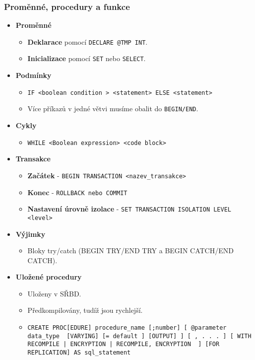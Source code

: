 \subsubsection{Proměnné, procedury a funkce}
\begin{itemize}
\item \textbf{Proměnné}
\begin{itemize}
\item \textbf{Deklarace} pomocí \texttt{DECLARE @TMP INT}.
\item \textbf{Inicializace} pomocí \texttt{SET} nebo \texttt{SELECT}.
\end{itemize}

\item \textbf{Podmínky}
\begin{itemize}
\item \texttt{IF <boolean condition > <statement> ELSE <statement>}
\item Více příkazů v jedné větvi musíme obalit do \texttt{BEGIN/END}.
\end{itemize}


\item \textbf{Cykly}
\begin{itemize}
\item \texttt{WHILE <Boolean expression> <code block>}
\end{itemize}


\item \textbf{Transakce}
\begin{itemize}
\item \textbf{Začátek} - \texttt{BEGIN TRANSACTION <nazev\_transakce>}
\item \textbf{Konec} - \texttt{ROLLBACK nebo COMMIT}
\item \textbf{Nastavení úrovně izolace} - \texttt{SET TRANSACTION ISOLATION LEVEL <level>}
\end{itemize}


\item \textbf{Výjimky}
\begin{itemize}
\item Bloky try/catch (BEGIN TRY/END TRY a BEGIN CATCH/END CATCH).
\end{itemize}


\item \textbf{Uložené procedury}
\begin{itemize}
\item Uloženy v SŘBD.
\item Předkompilovány, tudíž jsou rychlejší.
\item \texttt{CREATE PROC[EDURE] procedure\_name [;number] [{ @parameter data\_type } [VARYING] [= default ] [OUTPUT] ] [ , . . . ] [ WITH { RECOMPILE | ENCRYPTION | RECOMPILE, ENCRYPTION } ] [FOR REPLICATION] AS sql\_statement}
\end{itemize}



\end{itemize}
